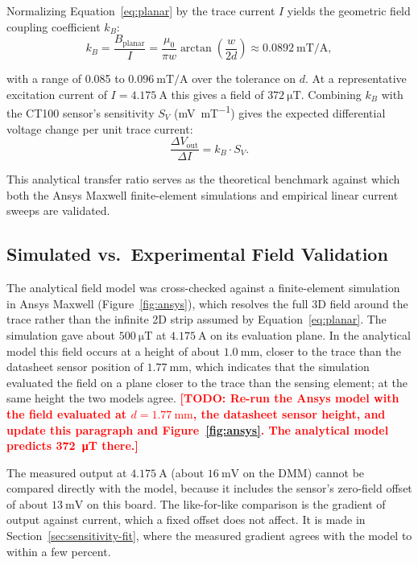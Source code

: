 \documentclass[12pt,a4paper]{article}
\newcommand{\todo}[1]{\textcolor{red}{\textbf{[TODO: #1]}}}
\begin{document}
Normalizing Equation~\eqref{eq:planar} by the trace current $I$ yields the geometric field coupling coefficient $k_B$:
\begin{equation}
k_B = \frac{B_{\text{planar}}}{I} = \frac{\mu_0}{\pi w} \arctan\left( \frac{w}{2d} \right) \approx \SI{0.0892}{\milli\tesla\per\ampere},
\label{eq:field-coeff}
\end{equation}

with a range of 0.085 to $\SI{0.096}{\milli\tesla\per\ampere}$ over the tolerance on $d$. At a representative excitation current of $I = \SI{4.175}{\ampere}$ this gives a field of $\SI{372}{\micro\tesla}$. Combining $k_B$ with the CT100 sensor's sensitivity $S_V$ (\si{\milli\volt\per\milli\tesla}) gives the expected differential voltage change per unit trace current:
\begin{equation}
\frac{\Delta V_{\text{out}}}{\Delta I} = k_B \cdot S_V.
\label{eq:sensitivity-transfer}
\end{equation}

This analytical transfer ratio serves as the theoretical benchmark against which both the Ansys Maxwell finite-element simulations and empirical linear current sweeps are validated.

\subsection{Simulated vs.\ Experimental Field Validation}
\label{sec:field-validation}

The analytical field model was cross-checked against a finite-element simulation in Ansys Maxwell (Figure~\ref{fig:ansys}), which resolves the full 3D field around the trace rather than the infinite 2D strip assumed by Equation~\eqref{eq:planar}. The simulation gave about $\SI{500}{\micro\tesla}$ at $\SI{4.175}{\ampere}$ on its evaluation plane. In the analytical model this field occurs at a height of about $\SI{1.0}{\milli\metre}$, closer to the trace than the datasheet sensor position of $\SI{1.77}{\milli\metre}$, which indicates that the simulation evaluated the field on a plane closer to the trace than the sensing element; at the same height the two models agree. \todo{Re-run the Ansys model with the field evaluated at $d = \SI{1.77}{\milli\metre}$, the datasheet sensor height, and update this paragraph and Figure~\ref{fig:ansys}. The analytical model predicts \SI{372}{\micro\tesla} there.}

The measured output at $\SI{4.175}{\ampere}$ (about $\SI{16}{\milli\volt}$ on the DMM) cannot be compared directly with the model, because it includes the sensor's zero-field offset of about $\SI{13}{\milli\volt}$ on this board. The like-for-like comparison is the gradient of output against current, which a fixed offset does not affect. It is made in Section~\ref{sec:sensitivity-fit}, where the measured gradient agrees with the model to within a few percent.
\end{document}
